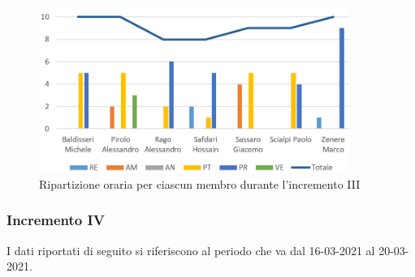 \begin{figure}[!htb]   
    \centering
    \includegraphics[width=0.9\textwidth]{Images/inc3}
	\caption{Ripartizione oraria per ciascun membro durante l'incremento III}
\end{figure}

\subsubsection{Incremento IV}

I dati riportati di seguito si riferiscono al periodo che va dal 16-03-2021 al 20-03-2021.

